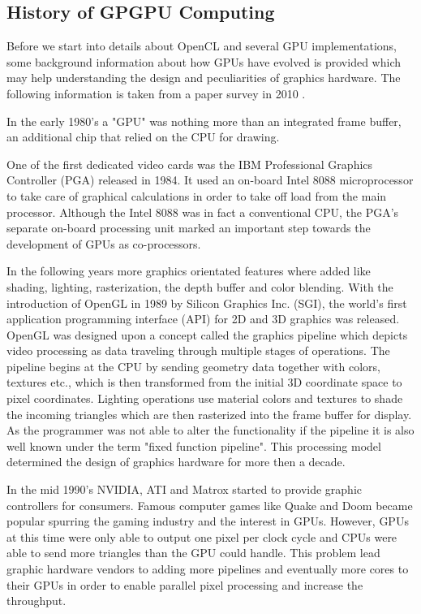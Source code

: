\subsection{History of GPGPU Computing} 
\label{sec:history}
Before we start into details about OpenCL and several GPU implementations, some background information about how GPUs have evolved is provided which may help understanding the design and peculiarities of graphics hardware. The following information is taken from a paper survey in 2010 \cite{gpu_history}.

In the early 1980's a "GPU" was nothing more than an integrated frame buffer, an additional chip that relied on the CPU for drawing.

One of the first dedicated video cards was the IBM Professional Graphics Controller (PGA) released in 1984. It used an on-board Intel 8088 microprocessor to take care of graphical calculations in order to take off load from the main processor. Although the Intel 8088 was in fact a conventional CPU, the PGA's separate on-board processing unit marked an important step towards the development of GPUs as co-processors.

In the following years more graphics orientated features where added like shading, lighting, rasterization, the depth buffer and color blending. With the introduction of OpenGL in 1989 by Silicon Graphics Inc. (SGI), the world's first application programming interface (API) for 2D and 3D graphics was released. OpenGL was designed upon a concept called the graphics pipeline which depicts video processing as data traveling through multiple stages of operations. The pipeline begins at the CPU by sending geometry data together with colors, textures etc., which is then transformed from the initial 3D coordinate space to pixel coordinates. Lighting operations use material colors and textures to shade the incoming triangles which are then rasterized into the frame buffer for display. As the programmer was not able to alter the functionality if the pipeline it is also well known under the term "fixed function pipeline". This processing model determined the design of graphics hardware for more then a decade.

In the mid 1990's NVIDIA, ATI and Matrox started to provide graphic controllers for consumers. Famous computer games like Quake and Doom became popular spurring the gaming industry and the interest in GPUs. However, GPUs at this time were only able to output one pixel per clock cycle and CPUs were able to send more triangles than the GPU could handle. This problem lead graphic hardware vendors to adding more pipelines and eventually more cores to their GPUs in order to enable parallel pixel processing and increase the throughput.

